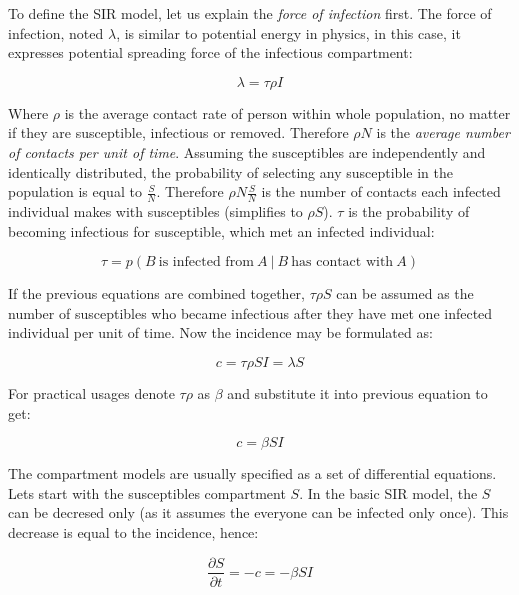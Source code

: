 \documentclass[
  digital, %
  oneside, %
  lof,     %
  lot,     %
]{fithesis4}
\begin{document}
To define the SIR model, let us explain the \textit{force of infection} first.
The force of infection, noted $\lambda$, is similar to 
potential energy in physics, in this case, it expresses 
potential spreading force of the infectious compartment:

\begin{equation}
	\lambda = \tau \rho I
\end{equation}

Where $\rho$ is the average contact rate of person within whole 
population, no matter if they are susceptible, infectious 
or removed. Therefore $\rho N$ is the \textit{average number 
of contacts per unit of time}.
Assuming the susceptibles are independently and identically 
distributed, the probability of selecting any susceptible 
in the population is equal to $\frac{S}{N}$.
Therefore $\rho N\frac{S}{N}$ is the number of contacts 
each infected individual makes with susceptibles 
(simplifies to $\rho S$).
$\tau$ is the probability of becoming infectious for 
susceptible, which met an infected individual:

\begin{equation}
	\tau = p \left( B~\textrm{is infected from}~A~|~B~\textrm{has contact with}~A \right)
\end{equation}

If the previous equations are combined together, 
$\tau \rho S$ can be assumed as the number of 
susceptibles who became infectious after they have 
met one infected individual per unit of time.
Now the incidence may be formulated as:

\begin{equation}
	c = \tau \rho S I = \lambda S
\end{equation}

For practical usages denote $\tau \rho$ as $\beta$ 
and substitute it into previous equation to get:

\begin{equation}
	c = \beta S I
\end{equation}

The compartment models are usually specified as a set of
differential equations. Lets start with the susceptibles
compartment $S$. In the basic SIR model, the $S$
can be decresed only (as it assumes the everyone can be 
infected only once).
This decrease is equal to the incidence, hence:

\begin{equation}
	\frac{\partial{S}}{\partial{t}} = -c = -\beta S I
\end{equation}
\end{document}
